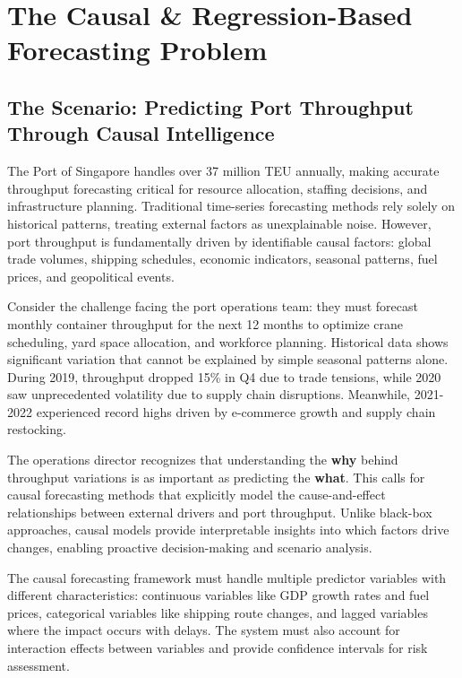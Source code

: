 \documentclass{article}
\begin{document}
\section{The Causal \& Regression-Based Forecasting Problem}

\subsection{The Scenario: Predicting Port Throughput Through Causal Intelligence}

The Port of Singapore handles over 37 million TEU annually, making accurate throughput forecasting critical for resource allocation, staffing decisions, and infrastructure planning. Traditional time-series forecasting methods rely solely on historical patterns, treating external factors as unexplainable noise. However, port throughput is fundamentally driven by identifiable causal factors: global trade volumes, shipping schedules, economic indicators, seasonal patterns, fuel prices, and geopolitical events.

Consider the challenge facing the port operations team: they must forecast monthly container throughput for the next 12 months to optimize crane scheduling, yard space allocation, and workforce planning. Historical data shows significant variation that cannot be explained by simple seasonal patterns alone. During 2019, throughput dropped 15\% in Q4 due to trade tensions, while 2020 saw unprecedented volatility due to supply chain disruptions. Meanwhile, 2021-2022 experienced record highs driven by e-commerce growth and supply chain restocking.

The operations director recognizes that understanding the \textbf{why} behind throughput variations is as important as predicting the \textbf{what}. This calls for causal forecasting methods that explicitly model the cause-and-effect relationships between external drivers and port throughput. Unlike black-box approaches, causal models provide interpretable insights into which factors drive changes, enabling proactive decision-making and scenario analysis.

The causal forecasting framework must handle multiple predictor variables with different characteristics: continuous variables like GDP growth rates and fuel prices, categorical variables like shipping route changes, and lagged variables where the impact occurs with delays. The system must also account for interaction effects between variables and provide confidence intervals for risk assessment.
\end{document}
